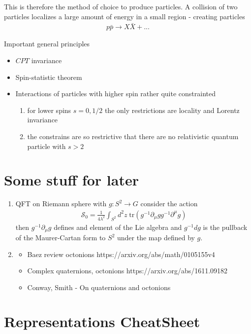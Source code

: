 \documentclass[10pt,a4paper]{article}
\theoremstyle{definition}
\begin{document}
This is therefore the method of choice to produce particles. A collision of two particles localizes a large amount of energy in a small region - creating particles
\begin{align}
    p\bar{p}\rightarrow X\bar{X}+ ...
\end{align}

Important general principles
\begin{itemize}
    \item $CPT$ invariance
    \item Spin-statistic theorem
    \item Interactions of particles with higher spin rather quite constrainted
    \begin{enumerate}
        \item for lower spins $s=0, 1/2$ the only restrictions are locality and Lorentz invariance
        \item the constrains are so restrictive that there are no relativistic quantum particle with $s>2$
    \end{enumerate}
\end{itemize}


\newpage 
\section{Some stuff for later}
\begin{enumerate}
    \item QFT on Riemann sphere with $g:S^2\rightarrow G$ consider the action 
    \begin{align}
        \mathcal{S}_0=\frac{1}{4\lambda^2}\int_{S^2}d^2z\;\text{tr}(g^{-1}\partial_\mu g g^{-1}\partial^\mu g)
    \end{align}
    then $g^{-1}\partial_\mu g$ defines and element of the Lie algebra and $g^{-1}dg$ is the pullback of the Maurer-Cartan form to $S^2$ under the map defined by $g$.
    \item 
    \begin{itemize}
        \item Baez review octonions {\sc https://arxiv.org/abs/math/0105155v4}
        \item Complex quaternions, octonions {\sc https://arxiv.org/abs/1611.09182}
        \item Conway, Smith - On quaternions and octonions
    \end{itemize}
\end{enumerate}


\newpage
\section{Representations CheatSheet}
\end{document}
